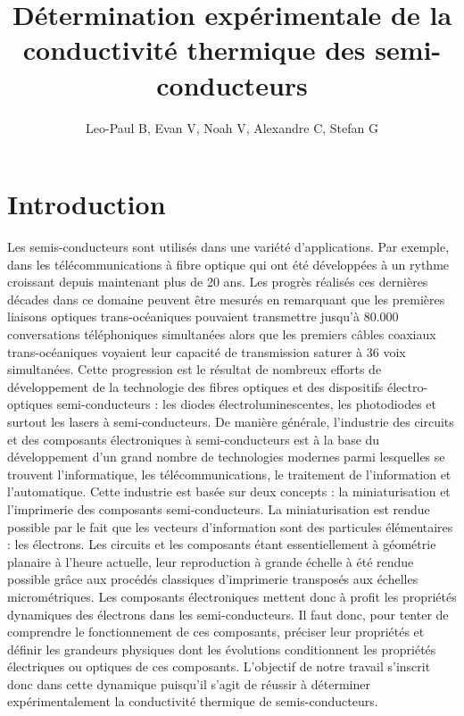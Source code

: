 \documentclass[10pt,a4paper]{report}
\begin{document}
\title{Détermination expérimentale de la conductivité thermique des semi-conducteurs}
\author{Leo-Paul B, Evan V, Noah V, Alexandre C, Stefan G}
\maketitle
\tableofcontents
\chapter{Introduction}
Les semis-conducteurs sont utilisés dans une variété d'applications. Par exemple, dans les télécommunications à fibre optique qui ont été développées à un rythme croissant depuis maintenant plus de 20 ans. Les progrès réalisés ces dernières décades dans ce domaine peuvent être mesurés en remarquant que les premières liaisons optiques trans-océaniques pouvaient transmettre jusqu'à 80.000 conversations téléphoniques simultanées alors que les premiers câbles coaxiaux trans-océaniques voyaient leur capacité de transmission saturer à 36 voix simultanées. Cette progression est le résultat de nombreux efforts de développement de la technologie des fibres optiques et des dispositifs électro-optiques semi-conducteurs : les diodes électroluminescentes, les photodiodes et surtout les lasers à semi-conducteurs. De manière générale, l’industrie des circuits et des composants électroniques à semi-conducteurs est à la base du développement d’un grand nombre de technologies modernes parmi lesquelles se trouvent l’informatique, les télécommunications, le traitement de l'information et l’automatique. Cette industrie est basée sur deux concepts : la miniaturisation et l'imprimerie des composants semi-conducteurs. La miniaturisation est rendue possible par le fait que les vecteurs d’information sont des particules élémentaires : les électrons. Les circuits et les composants étant essentiellement à géométrie planaire à l’heure actuelle, leur reproduction à grande échelle à été rendue possible grâce aux procédés classiques d’imprimerie transposés aux échelles micrométriques. Les composants électroniques mettent donc à profit les propriétés dynamiques des électrons dans les semi-conducteurs. Il faut donc, pour tenter de comprendre le fonctionnement de ces composants, préciser leur propriétés et définir les grandeurs physiques dont les évolutions conditionnent les propriétés électriques ou optiques de ces composants. L'objectif de notre travail s'inscrit donc dans cette dynamique puisqu'il s'agit de réussir à déterminer expérimentalement la conductivité thermique de semis-conducteurs.
\end{document}
